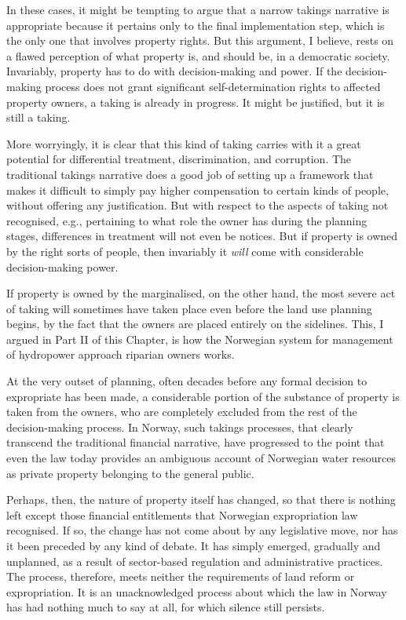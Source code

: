 In these cases, it might be tempting to argue that a narrow takings narrative is appropriate because it pertains only to the final implementation step, which is the only one that involves property rights. But this argument, I believe, rests on a flawed perception of what property is, and should be, in a democratic society. Invariably, property has to do with decision-making and power. If the decision-making process does not grant significant self-determination rights to affected property owners, a taking is already in progress. It might be justified, but it is still a taking. 

More worryingly, it is clear that this kind of taking carries with it a great potential for differential treatment, discrimination, and corruption. The traditional takings narrative does a good job of setting up a framework that makes it difficult to simply pay higher compensation to certain kinds of people, without offering any justification. But with respect to the aspects of taking not recognised, e.g., pertaining to what role the owner has during the planning stages, differences in treatment will not even be notices. But if property is owned by the right sorts of people, then invariably it {\it will} come with considerable decision-making power. 

If property is owned by the marginalised, on the other hand, the most severe act of taking will sometimes have taken place even before the land use planning begins, by the fact that the owners are placed entirely on the sidelines. This, I argued in Part II of this Chapter, is how the Norwegian system for management of hydropower approach riparian owners works. 

At the very outset of planning, often decades before any formal decision to expropriate has been made, a considerable portion of the substance of property is taken from the owners, who are completely excluded from the rest of the decision-making process. In Norway, such takings processes, that clearly transcend the traditional financial narrative, have progressed to the point that even the law today provides an ambiguous account of Norwegian water resources as private property belonging to the general public.

Perhaps, then, the nature of property itself has changed, so that there is nothing left except those financial entitlements that Norwegian expropriation law recognised. If so, the change has not come about by any legislative move, nor has it been preceded by any kind of debate. It has simply emerged, gradually and unplanned, as a result of sector-based regulation and administrative practices. The process, therefore, meets neither the requirements of land reform or expropriation. It is an unacknowledged process about which the law in Norway has had nothing much to say at all, for which silence still persists. 


